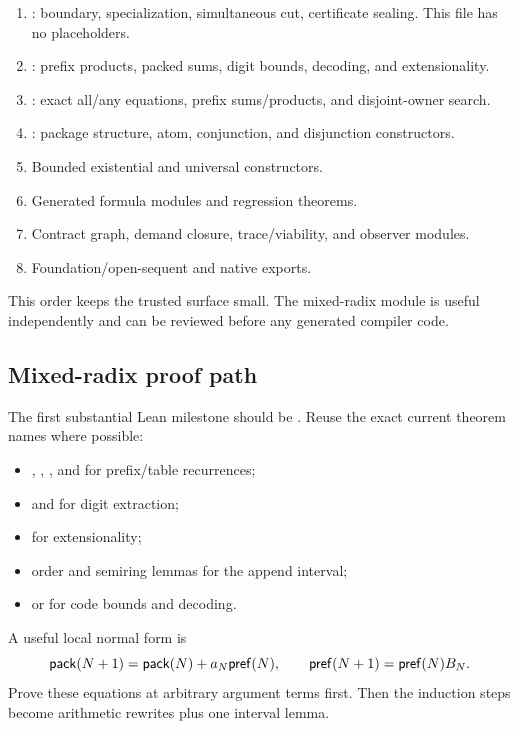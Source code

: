 \begin{enumerate}
\item {}: boundary, specialization, simultaneous cut,
certificate sealing.  This file has no placeholders.
\item {}: prefix products, packed sums, digit bounds,
decoding, and extensionality.
\item {}: exact all/any equations, prefix sums/products,
and disjoint-owner search.
\item {}: package structure, atom, conjunction, and
disjunction constructors.
\item Bounded existential and universal constructors.
\item Generated formula modules and regression theorems.
\item Contract graph, demand closure, trace/viability, and observer modules.
\item Foundation/open-sequent and native exports.
\end{enumerate}

This order keeps the trusted surface small.  The mixed-radix module is useful
independently and can be reviewed before any generated compiler code.

\subsection{Mixed-radix proof path}

The first substantial Lean milestone should be
.  Reuse the exact current theorem
names where possible:

\begin{itemize}
\item {}, , , and
 for prefix/table recurrences;
\item {} and  for digit extraction;
\item {} for extensionality;
\item order and semiring lemmas for the append interval;
\item {} or  for code bounds and decoding.
\end{itemize}

A useful local normal form is
\[
 \mathsf{pack}(N+1)=\mathsf{pack}(N)+a_N\mathsf{pref}(N),
 \qquad
 \mathsf{pref}(N+1)=\mathsf{pref}(N)B_N.
\]
Prove these equations at arbitrary argument terms first.  Then the induction
steps become arithmetic rewrites plus one interval lemma.

